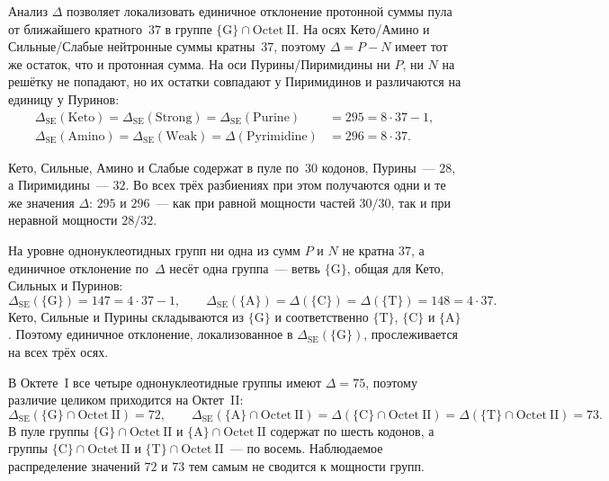 \documentclass[11pt,a4paper]{article}
\renewcommand{\_}{\origunderscore\allowbreak}
\begin{document}
Анализ $\Delta$ позволяет локализовать единичное отклонение протонной
суммы пула от ближайшего кратного~$37$ в группе $\{\mathrm{G}\} \cap
\mathrm{Octet~II}$. На осях Кето/Амино и Сильные/Слабые нейтронные суммы
кратны~$37$, поэтому $\Delta = P - N$ имеет тот же остаток, что и
протонная сумма. На оси Пурины/Пиримидины ни $P$, ни $N$ на решётку не
попадают, но их остатки совпадают у Пиримидинов и различаются на единицу у
Пуринов:
\[
\begin{aligned}
\Delta_{\mathrm{SE}}(\mathrm{Keto}) = \Delta_{\mathrm{SE}}(\mathrm{Strong})
  = \Delta_{\mathrm{SE}}(\mathrm{Purine})
  &= 295 = 8 \cdot 37 - 1, \\
\Delta_{\mathrm{SE}}(\mathrm{Amino}) = \Delta_{\mathrm{SE}}(\mathrm{Weak})
  = \Delta(\mathrm{Pyrimidine})
  &= 296 = 8 \cdot 37.
\end{aligned}
\]

Кето, Сильные, Амино и Слабые содержат в пуле по~$30$ кодонов, Пурины~---
$28$, а Пиримидины~--- $32$. Во всех трёх разбиениях при этом получаются
одни и те же значения $\Delta$: $295$ и $296$~--- как при равной мощности
частей $30/30$, так и при неравной мощности $28/32$.

На уровне однонуклеотидных групп ни одна из сумм $P$ и $N$ не кратна $37$,
а единичное отклонение по~$\Delta$ несёт одна группа~--- ветвь $\{\mathrm{G}\}$, общая
для Кето, Сильных и Пуринов:
\[
\Delta_{\mathrm{SE}}(\{\mathrm{G}\}) = 147 = 4 \cdot 37 - 1,
\qquad
\Delta_{\mathrm{SE}}(\{\mathrm{A}\}) =
\Delta(\{\mathrm{C}\}) =
\Delta(\{\mathrm{T}\}) = 148 = 4 \cdot 37.
\]
Кето, Сильные и Пурины складываются из $\{\mathrm{G}\}$ и соответственно
$\{\mathrm{T}\}$, $\{\mathrm{C}\}$ и $\{\mathrm{A}\}$. Поэтому единичное
отклонение, локализованное в $\Delta_{\mathrm{SE}}(\{\mathrm{G}\})$,
прослеживается на всех трёх осях.

В Октете~I все четыре однонуклеотидные группы имеют $\Delta = 75$,
поэтому различие целиком приходится на Октет~II:
\[
\Delta_{\mathrm{SE}}(\{\mathrm{G}\} \cap \mathrm{Octet~II}) = 72,
\qquad
\Delta_{\mathrm{SE}}(\{\mathrm{A}\} \cap \mathrm{Octet~II}) =
\Delta(\{\mathrm{C}\} \cap \mathrm{Octet~II}) =
\Delta(\{\mathrm{T}\} \cap \mathrm{Octet~II}) = 73.
\]
В пуле группы $\{\mathrm{G}\} \cap \mathrm{Octet~II}$ и $\{\mathrm{A}\}
\cap \mathrm{Octet~II}$ содержат по шесть кодонов, а группы
$\{\mathrm{C}\} \cap \mathrm{Octet~II}$ и $\{\mathrm{T}\} \cap
\mathrm{Octet~II}$~--- по восемь. Наблюдаемое распределение значений $72$
и $73$ тем самым не сводится к мощности групп.
\end{document}
